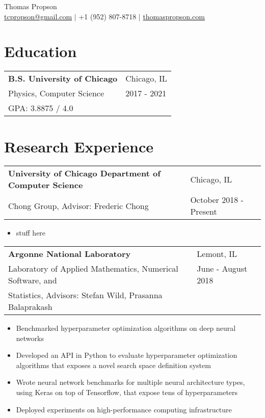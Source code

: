 \documentclass[letterpaper, 12pt]{article}
\begin{document}
\begin{center}
{\huge
  Thomas Propson \\[5pt]
}
\href{mailto:tcpropson@gmail.com}{tcpropson@gmail.com} $\vert$
+1 (952) 807-8718 $\vert$
\href{https://thomaspropson.com}{thomaspropson.com}
\end{center}

\section{Education}
\noindent
\flushleft
{
  \begin{tabular}{@{} L{13cm} @{} R{3.51cm} @{}}
    \textbf{B.S. University of Chicago} & Chicago, IL \\
    Physics, Computer Science & 2017 - 2021 \\
    GPA: 3.8875 / 4.0 & \\
  \end{tabular}
}

\section{Research Experience}
\noindent
\flushleft
{
  \begin{tabular}{@{} L{12cm} @{} R{4.51cm} @{}}
    \textbf{University of Chicago Department of Computer Science} & Chicago, IL \\
    Chong Group, Advisor: Frederic Chong & October 2018 - Present \\
  \end{tabular}
}
\vspace{-10pt}
\begin{itemize}
  \setlength\itemsep{0pt}
  \item stuff here
\end{itemize}
{
  \begin{tabular}{@{} L{12cm} @{} R{4.51cm} @{}}
    \textbf{Argonne National Laboratory} & Lemont, IL \\
    Laboratory of Applied Mathematics, Numerical Software, and & June - August 2018 \\
    Statistics, Advisors: Stefan Wild, Prasanna Balaprakash & \\
  \end{tabular}
}
\vspace{-10pt}
\begin{itemize}
  \item Benchmarked hyperparameter optimization algorithms on deep neural networks
  \item Developed an API in Python to evaluate hyperparameter optimization algorithms that exposes a novel search space definition system 
  \item Wrote neural network benchmarks for multiple neural architecture types, using Keras on top of Tensorflow, that expose tens of hyperparameters 
  \item Deployed experiments on high-performance computing infrastructure 
\end{itemize}
\end{document}

